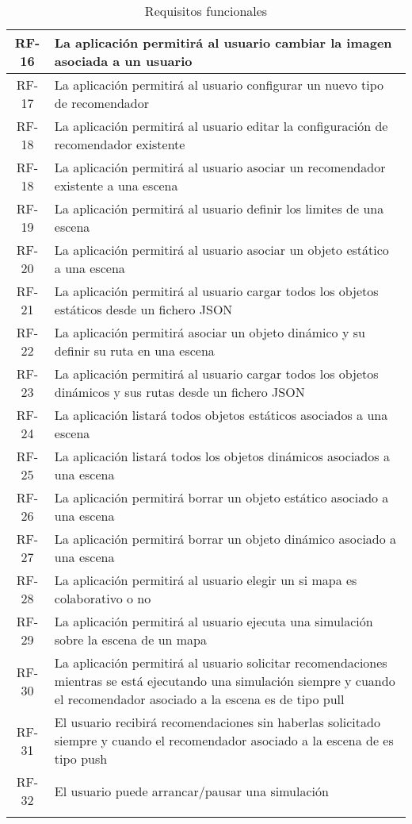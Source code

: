 \begin{longtable}[H]{|c|p{10cm}|}
	RF-16 & La aplicación permitirá al usuario cambiar la imagen asociada a un usuario\\ \hline
	RF-17 & La aplicación permitirá al usuario configurar un nuevo tipo de recomendador\\ \hline
	RF-18 & La aplicación permitirá al usuario editar la configuración de recomendador existente\\ \hline
	RF-18 & La aplicación permitirá al usuario asociar un recomendador existente a una escena\\ \hline
	RF-19 & La aplicación permitirá al usuario definir los limites de una escena\\ \hline
	RF-20 & La aplicación permitirá al usuario asociar un objeto estático a una escena\\ \hline
	RF-21 & La aplicación permitirá al usuario cargar todos los objetos estáticos desde un fichero JSON\\ \hline
	RF-22 & La aplicación permitirá asociar un objeto dinámico y su definir su ruta en una escena\\ \hline
	RF-23 & La aplicación permitirá al usuario cargar todos los objetos dinámicos y sus rutas desde un fichero JSON\\ \hline
	RF-24 & La aplicación listará todos objetos estáticos asociados a una escena \\ \hline
	RF-25 & La aplicación listará todos los objetos dinámicos asociados a una escena \\ \hline
	RF-26 & La aplicación permitirá borrar un objeto estático asociado a una escena\\ \hline
	RF-27 & La aplicación permitirá borrar un objeto dinámico asociado a una escena\\ \hline
	RF-28 & La aplicación permitirá al usuario elegir un si mapa es colaborativo o no\\ \hline
	RF-29 & La aplicación permitirá al usuario ejecuta una simulación sobre la escena de un mapa\\ \hline
	RF-30 & La aplicación permitirá al usuario solicitar recomendaciones mientras se está ejecutando una simulación siempre y cuando el recomendador asociado a la escena es de tipo pull\\ \hline
	RF-31 & El usuario recibirá recomendaciones sin haberlas solicitado siempre y cuando el recomendador asociado a la escena de es tipo push\\ \hline
	RF-32 & El usuario puede arrancar/pausar una simulación\\ \hline
	\caption{Requisitos funcionales}
	\label{tabla:requisitosFuncionales2}
\end{longtable}


